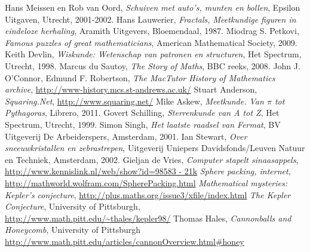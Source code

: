 
\begin{thebibliography}{8}
\label{1} Hans Meissen en Rob van Oord, \textit{Schuiven met auto's, munten en bollen}, Epsilon Uitgaven, Utrecht, 2001-2002.
\label{2} Hans Lauwerier, \textit{Fractals, Meetkundige figuren in eindeloze herhaling}, Aramith Uitgevers, Bloemendaal, 1987.
\label{3} Miodrag S. Petkovi, \textit{Famous puzzles of great mathematicians}, American Mathematical Society, 2009.
\label{4} Keith Devlin, \textit{Wiskunde: Wetenschap van patronen en structuren}, Het Spectrum, Utrecht, 1998.
\label{5} Marcus du Sautoy, \textit{The Story of Maths}, BBC reeks, 2008.
\label{6} John J. O'Connor, Edmund F. Robertson, \textit{The MacTutor History of Mathematics archive}, \url{http://www-history.mcs.st-andrews.ac.uk/}
\label{7} Stuart Anderson, \textit{Squaring.Net}, \url{http://www.squaring.net/}
\label{8} Mike Askew, \textit{Meetkunde. Van $\pi$ tot Pythagoras}, Librero, 2011.
\label{9} Govert Schilling, \textit{Sterrenkunde van A tot Z}, Het Spectrum, Utrecht, 1999.
\label{10} Simon Singh, \textit{Het laatste raadsel van Fermat}, BV Uitgeverij De Arbeiderspers, Amsterdam, 2001.
\label{11} Ian Stewart, \textit{Over sneeuwkristallen en zebrastrepen}, Uitgeverij Uniepers Davidsfonds/Leuven Natuur en Techniek, Amsterdam, 2002.
\label{12} Gieljan de Vries, \textit{Computer stapelt sinaasappels}, \url{http://www.kennislink.nl/web/show?id=98583 - 21k}
\label{13} \textit{Sphere packing, internet}, \url{http://mathworld.wolfram.com/SpherePacking.html}
\label{14} \textit{Mathematical mysteries: Kepler's conjecture}, \url{http://plus.maths.org/issue3/xfile/index.html}
\label{15} \textit{The Kepler Conjecture}, University of Pittsburgh, \url{http://www.math.pitt.edu/~thales/kepler98/}
\label{16} Thomas Hales, \textit{Cannonballs and Honeycomb}, University of Pittsburgh \url{http://www.math.pitt.edu/articles/cannonOverview.html#honey}

\end{thebibliography}